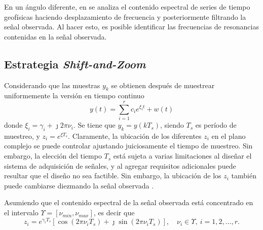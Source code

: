		En un ángulo diferente, en \cite{Bolt1979} se analiza el contenido espectral de series de tiempo geofísicas haciendo desplazamiento de frecuencia y posteriormente filtrando la señal observada. Al hacer esto, es posible identificar las frecuencias de resonancias contenidas en la señal observada.
		
	
		\subsection{Estrategia \emph{Shift-and-Zoom}}
		
			Considerando que las muestras $y_k$ se obtienen después de muestrear uniformemente la versión en tiempo continuo 
			\begin{equation}
				y(t) = \sum_{i=1}^r c_ie^{\xi_i t} + w(t)
				\label{Eq:signalTimeCont}
			\end{equation}
			donde $\xi_i = \gamma_i+\jmath 2\pi\nu_i$. Se tiene que $y_k = y(kT_s)$, siendo $T_s$ es período de muestreo, y $z_i = e^{\xi T_s}$. Claramente, la ubicación de los diferentes $z_i$ en el plano complejo se puede controlar ajustando juiciosamente el tiempo de muestreo. Sin embargo, la elección del tiempo $T_s$ está sujeta a varias limitaciones al diseñar el sistema de adquisición de señales, y al agregar requisitos adicionales puede resultar que el diseño no sea factible. Sin embargo, la ubicación de los $z_i$ también puede cambiarse diezmando la señal observada \cite{Vaidyanathan1993}.
	
			Asumiendo que el contenido espectral de la señal observada está concentrado en el intervalo $\Upsilon = [\nu_{min},\nu_{max}]$, es decir que
			\begin{equation}
				z_i = e^{\gamma_iT_s}[\cos(2\pi\nu_iT_s)+\jmath\sin(2\pi\nu_iT_s)], \quad \nu_i\in\Upsilon,\ i=1,2,\ldots,r.
				\label{Eq:FrecInterval}
			\end{equation}
	
